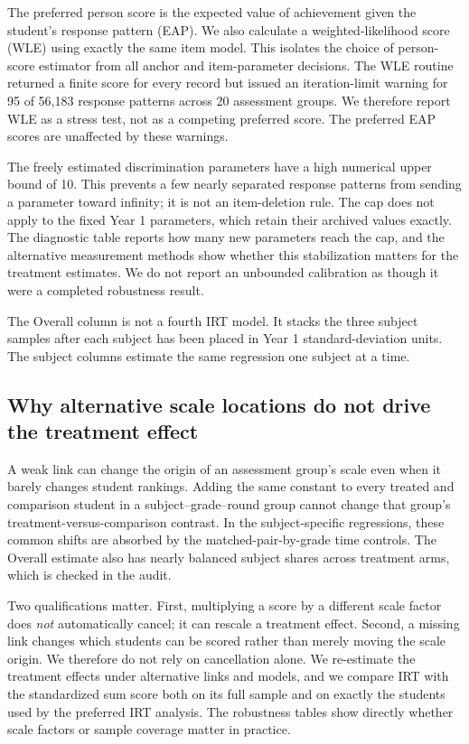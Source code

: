 The preferred person score is the expected value of achievement given the
student's response pattern (EAP). We also calculate a weighted-likelihood
score (WLE) using exactly the same item model. This isolates the choice of
person-score estimator from all anchor and item-parameter decisions. The WLE
routine returned a finite score for every record but issued an iteration-limit
warning for 95 of 56,183 response patterns across 20 assessment groups. We
therefore report WLE as a stress test, not as a competing preferred score. The
preferred EAP scores are unaffected by these warnings.

The freely estimated discrimination parameters have a high numerical upper
bound of 10. This prevents a few nearly separated response patterns from
sending a parameter toward infinity; it is not an item-deletion rule. The cap
does not apply to the fixed Year 1 parameters, which retain their archived
values exactly. The diagnostic table reports how many new parameters reach the
cap, and the alternative measurement methods show whether this stabilization
matters for the treatment estimates. We do not report an unbounded calibration
as though it were a completed robustness result.

The Overall column is not a fourth IRT model. It stacks the three subject
samples after each subject has been placed in Year 1 standard-deviation units.
The subject columns estimate the same regression one subject at a time.

\subsection{Why alternative scale locations do not drive the treatment effect}

A weak link can change the origin of an assessment group's scale even when it
barely changes student rankings. Adding the same constant to every treated and
comparison student in a subject--grade--round group cannot change that group's
treatment-versus-comparison contrast. In the subject-specific regressions,
these common shifts are absorbed by the matched-pair-by-grade time controls.
The Overall estimate also has nearly balanced subject shares across treatment
arms, which is checked in the audit.

Two qualifications matter. First, multiplying a score by a different scale
factor does \emph{not} automatically cancel; it can rescale a treatment effect.
Second, a missing link changes which students can be scored rather than merely
moving the scale origin. We therefore do not rely on cancellation alone. We
re-estimate the treatment effects under alternative links and models, and we
compare IRT with the standardized sum score both on its full sample and on
exactly the students used by the preferred IRT analysis. The robustness tables
show directly whether scale factors or sample coverage matter in practice.

